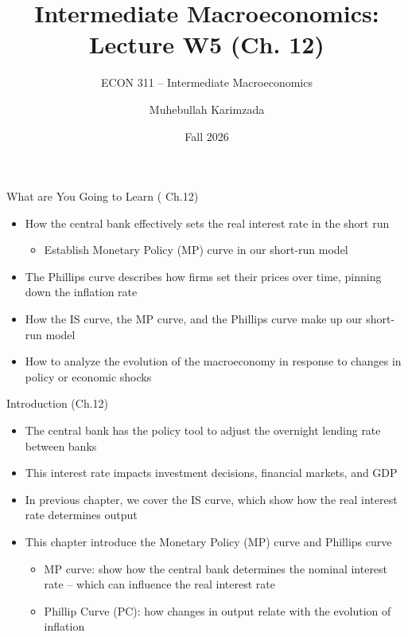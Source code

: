 \documentclass[aspectratio=1610]{beamer}
\title[Winter - Lecture 5] %
{Intermediate Macroeconomics: Lecture  W5 (Ch. 12)}
\subtitle{ECON 311 -- Intermediate Macroeconomics}
\author{Muhebullah Karimzada}
\institute{School of Economics \\\ University of Northern British Columbia}
\date{Fall 2026}
\begin{document}
\begin{frame}[plain]
  \titlepage
\end{frame}

\begin{frame}[wide]{What are You Going to Learn ( Ch.12)}
	\begin{itemize}
		\item How the central bank effectively sets the real interest rate in the short run
		\vspace{1mm}
		\begin{itemize}
			\item Establish Monetary Policy (MP) curve in our short-run model
		\end{itemize}
		\vspace{2mm}
		\item The Phillips curve describes how firms set their prices over time, pinning down the inflation rate
		\vspace{2mm}
		\item How the IS curve, the MP curve, and the Phillips curve make up our short-run model
		\vspace{2mm}
		\item How to analyze the evolution of the macroeconomy in response to changes in policy or economic shocks
	\end{itemize}
\end{frame}

\begin{frame}[wide]{Introduction (Ch.12)}
	\begin{itemize}
		\item The central bank has the policy tool to adjust the overnight lending rate between banks
		\vspace{2mm}
		\item This interest rate impacts investment decisions, financial markets, and GDP
		\vspace{2mm}
		\item In previous chapter, we cover the IS curve, which show how the real interest rate determines output
		\vspace{2mm}
		\item This chapter introduce the Monetary Policy (MP) curve and Phillips curve 
		\vspace{1mm}
		\begin{itemize}
			\item MP curve: show how the central bank determines the nominal interest rate -- which can influence the real interest rate
			\vspace{1mm}
			\item Phillip Curve (PC): how changes in output relate with the evolution of inflation
		\end{itemize}
	\end{itemize}
\end{frame}
\end{document}
